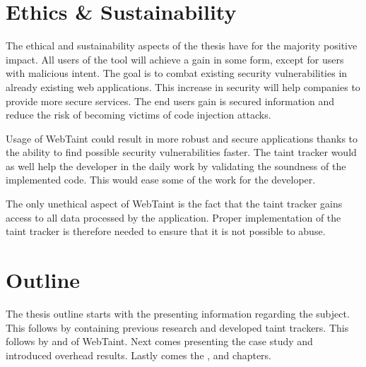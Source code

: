 \section{Ethics \& Sustainability}
\label{Ethics}
The ethical and sustainability aspects of the thesis have for the majority positive impact. All users of the tool will achieve a gain in some form, except for users with malicious intent. The goal is to combat existing security vulnerabilities in already existing web applications. This increase in security will help companies to provide more secure services. The end users gain is secured information and reduce the risk of becoming victims of code injection attacks.

Usage of WebTaint could result in more robust and secure applications thanks to the ability to find possible security vulnerabilities faster. The taint tracker would as well help the developer in the daily work by validating the soundness of the implemented code. This would ease some of the work for the developer.

The only unethical aspect of WebTaint is the fact that the taint tracker gains access to all data processed by the application. Proper implementation of the taint tracker is therefore needed to ensure that it is not possible to abuse.



\section{Outline}
\label{Outline}
The thesis outline starts with the \textit{} presenting information regarding the subject. This follows by \textit{} containing previous research and developed taint trackers. This follows by \textit{} and \textit{} of WebTaint. Next comes \textit{} presenting the case study and introduced overhead results. Lastly comes the \textit{}, \textit{} and \textit{} chapters.